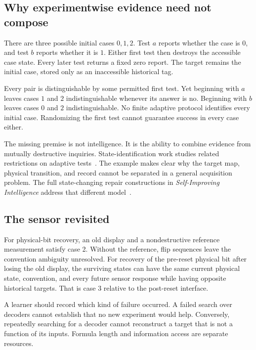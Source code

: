 \subsection{Why experimentwise evidence need not compose}
\begin{GAcounterexample}\label{GA:ce:destructive}
There are three possible initial cases $0,1,2$. Test $a$ reports whether the case is $0$, and test $b$ reports whether it is $1$. Either first test then destroys the accessible case state. Every later test returns a fixed zero report. The target remains the initial case, stored only as an inaccessible historical tag.

Every pair is distinguishable by some permitted first test. Yet beginning with $a$ leaves cases $1$ and $2$ indistinguishable whenever its answer is no. Beginning with $b$ leaves cases $0$ and $2$ indistinguishable. No finite adaptive protocol identifies every initial case. Randomizing the first test cannot guarantee success in every case either.
\end{GAcounterexample}

The missing premise is not intelligence. It is the ability to combine evidence from mutually destructive inquiries. State-identification work studies related restrictions on adaptive tests~\cite{GA:stateid}. The example makes clear why the target map, physical transition, and record cannot be separated in a general acquisition problem. The full state-changing repair constructions in \emph{Self-Improving Intelligence} address that different model~\cite{GA:selfimproving}.

\subsection{The sensor revisited}
For physical-bit recovery, an old display and a nondestructive reference measurement satisfy case 2. Without the reference, flip sequences leave the convention ambiguity unresolved. For recovery of the pre-reset physical bit after losing the old display, the surviving states can have the same current physical state, convention, and every future sensor response while having opposite historical targets. That is case 3 relative to the post-reset interface.

A learner should record which kind of failure occurred. A failed search over decoders cannot establish that no new experiment would help. Conversely, repeatedly searching for a decoder cannot reconstruct a target that is not a function of its inputs. Formula length and information access are separate resources.

